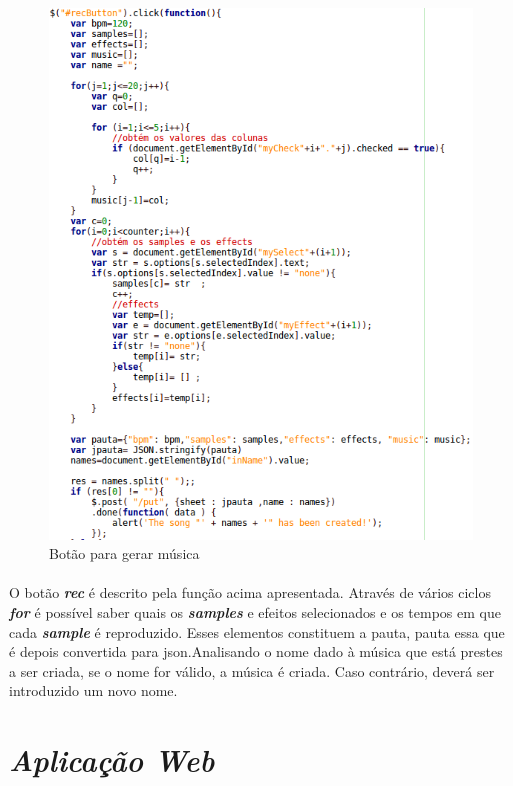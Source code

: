 \documentclass[a4paper]{report}
\begin{document}
\begin{figure}[H]
\center
\includegraphics{imagens/page3_recbutton}
\caption{Botão para gerar música}
\end{figure}
\paragraph{}O botão \textit{\textbf{rec}} é descrito pela função acima apresentada. Através de vários ciclos \textit{\textbf{for}} é possível saber quais os \textit{\textbf{samples}} e efeitos selecionados e os tempos em que cada \textit{\textbf{sample}} é reproduzido. Esses elementos constituem a pauta, pauta essa que é depois convertida para \ac{json}.Analisando o nome dado à música que está prestes a ser criada, se o nome for válido, a música é criada. Caso contrário, deverá ser introduzido um novo nome.

\newpage

\section{\textit{Aplicação Web}}
\end{document}
